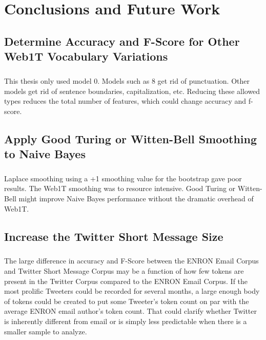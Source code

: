 \chapter{Conclusions and Future Work}

\section{Determine Accuracy and F-Score for Other Web1T Vocabulary Variations}
\paragraph{} This thesis only used model 0.  Models such as 8 get rid of punctuation.  Other models get rid of sentence boundaries, capitalization, etc.  Reducing these allowed types reduces the total number of features, which could change accuracy and f-score.

\section{Apply Good Turing or Witten-Bell Smoothing to Naive Bayes}
\paragraph{} Laplace smoothing using a +1 smoothing value for the bootstrap gave poor results.  The Web1T smoothing was to resource intensive.  Good Turing or Witten-Bell might improve Naive Bayes performance without the dramatic overhead of Web1T.

\section{Increase the Twitter Short Message Size}
	\paragraph{} The large difference in accuracy and F-Score between the ENRON Email Corpus and Twitter Short Message Corpus may be a function of how few tokens are present in the Twitter Corpus compared to the ENRON Email Corpus.  If the most prolific Tweeters could be recorded for several months, a large enough body of tokens could be created to put some Tweeter's token count on par with the average ENRON email author's token count.  That could clarify whether Twitter is inherently different from email or is simply less predictable when there is a smaller sample to analyze.

